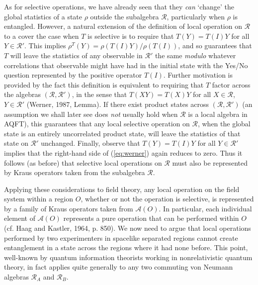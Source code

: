 \documentclass[12pt]{article}
\newcommand{\alg}[1]{\mbox{$\mathcal{#1}$}}
\begin{document}
As for selective 
operations, we have already seen that they
\emph{can}
`change' the global statistics of  a state $\rho$ outside the 
subalgebra $\alg{R}$, particularly when $\rho$ is entangled.  
However, a natural extension of the definition of local operation on 
$\alg{R}$ to a cover the case when $T$ is selective is to require that 
$T(Y)=T(I)Y$ for all $Y\in\alg{R}'$.  This implies 
$\rho^{T}(Y)=\rho(T(I)Y)/\rho(T(I))$, and so guarantees that $T$ will 
leave the statistics of any observable in $\alg{R}'$ the same 
\emph{modulo} whatever correlations that observable might have had in the initial 
state with the Yes/No 
question represented by the 
positive operator $T(I)$.  Further motivation is provided by the fact 
this definition is equivalent to requiring that $T$ factor across the 
algebras $(\alg{R},\alg{R}')$, in the sense that $T(XY)=T(X)Y$ for 
all $X\in\alg{R}$, $Y\in\alg{R}'$ (Werner, 1987, Lemma).  If there exist product states across 
$(\alg{R},\alg{R}')$ (an assumption we shall later see does \emph{not} 
usually hold when $\alg{R}$ is a local algebra in AQFT), this guarantees that any local selective 
operation on $\alg{R}$, when the global state is an entirely 
uncorrelated product state, will leave the statistics of that state on 
$\alg{R}'$ unchanged.  Finally, observe that 
$T(Y)=T(I)Y$ for all $Y\in\alg{R}'$ implies that the right-hand side of (\ref{eq:werner}) again 
reduces to zero.  Thus it follows (as before) that  
selective local operations 
on $\alg{R}$ must also be represented by Kraus 
operators taken from the subalgebra $\alg{R}$.      

Applying these considerations to field theory, any local operation on the field 
system 
within a region $O$, whether or not the operation is selective, is represented by a family of Kraus 
operators taken from $\alg{A}(O)$.  In particular, 
each individual
element of $\alg{A}(O)$ represents a pure operation that can be 
performed within $O$ (cf. Haag and Kastler, 1964, p. 850).    
We now need to argue that local operations performed by two 
experimenters in spacelike separated regions cannot create entanglement 
in a state across the regions where it had none before.  This point, well-known 
 by quantum information theorists working in nonrelativistic quantum theory, 
 in fact applies 
quite generally to any two commuting von Neumann algebras $\alg{R}_{A}$ and 
$\alg{R}_{B}$.  
\end{document}
